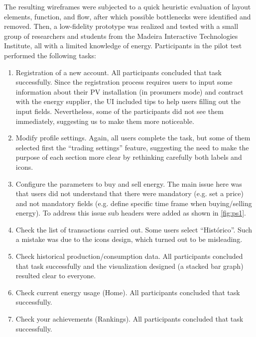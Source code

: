 The resulting wireframes were subjected to a quick heuristic evaluation of layout elements, function, and flow, after which possible bottlenecks were identified and removed. Then, a low-fidelity prototype was realized and tested with a small group of researchers and students from the Madeira Interactive Technologies Institute, all with a limited knowledge of energy.
Participants in the pilot test performed the following tasks:
\begin{enumerate}
    \item Registration of a new account. All participants concluded that task successfully. Since the registration process requires users to input some information about their \ac{PV} installation (in prosumers mode) and contract with the energy supplier, the \ac{UI} included tips to help users filling out the input fields. Nevertheless, some of the participants did not see them immediately, suggesting us to make them more noticeable. 
    \item Modify profile settings. Again, all users complete the task, but some of them selected first the “trading settings” feature, suggesting the need to make the purpose of each section more clear by rethinking carefully both labels and icons.
    \item Configure the parameters to buy and sell energy. The main issue here was that users did not understand that there were mandatory (e.g. set a price) and not mandatory fields (e.g. define specific time frame when buying/selling energy). To address this issue sub headers were added as shown in \cref{fig:ps1}.
    \item Check the list of transactions carried out. Some users select “Histórico”. Such a mistake was due to the icons design, which turned out to be misleading.
    \item Check historical production/consumption data. All participants concluded that task successfully and the visualization designed (a stacked bar graph) resulted clear to everyone.
    \item Check current energy usage (Home). All participants concluded that task successfully.
    \item Check your achievements (Rankings). All participants concluded that task successfully.
\end{enumerate}


